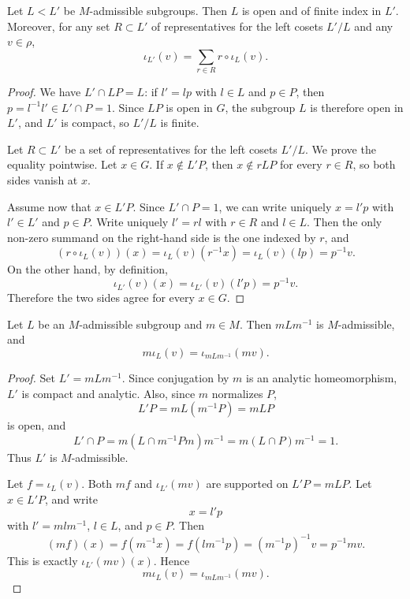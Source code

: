\documentclass[12pt,a4paper]{amsart}%
\begin{document}
\begin{lemma}\label{lem:iota.enlarge}
Let $L<L'$ be $M$-admissible subgroups. Then $L$ is open and of finite index in $L'$. Moreover, for any set $R\subset L'$ of representatives for the left cosets $L'/L$ and any $v\in \rho$,
$$
\iota_{L'}(v)=\sum_{r\in R} r\circ \iota_{L}(v).
$$
\end{lemma}
\begin{proof}
We have $L'\cap LP=L$: if $l'=lp$ with $l\in L$ and $p\in P$, then
$p=l^{-1}l'\in L'\cap P=1$. Since $LP$ is open in $G$, the subgroup $L$ is
therefore open in $L'$, and $L'$ is compact, so $L'/L$ is finite.

Let $R\subset L'$ be a set of representatives for the left cosets $L'/L$.
We prove the equality pointwise. Let $x\in G$. If $x\notin L'P$, then
$x\notin rLP$ for every $r\in R$, so both sides vanish at $x$.

Assume now that $x\in L'P$. Since $L'\cap P=1$, we can write uniquely
$x=l'p$ with $l'\in L'$ and $p\in P$. Write uniquely $l'=rl$ with
$r\in R$ and $l\in L$. Then the only non-zero summand on the right-hand side
is the one indexed by $r$, and
$$
(r\circ \iota_{L}(v))(x)
=
\iota_{L}(v)(r^{-1}x)
=
\iota_{L}(v)(lp)
=
p^{-1}v.
$$
On the other hand, by definition,
$$
\iota_{L'}(v)(x)=\iota_{L'}(v)(l'p)=p^{-1}v.
$$
Therefore the two sides agree for every $x\in G$.
\end{proof}





\begin{lemma}\label{lem:iota.M}
    Let $L$ be an $M$-admissible subgroup and $m\in M$.
    Then $mLm^{-1}$ is $M$-admissible, and
    $$m\iota_{L}(v)=\iota_{mLm^{-1}}(mv).$$
\end{lemma}
\begin{proof}
Set $L'=mLm^{-1}$. Since conjugation by $m$ is an analytic homeomorphism, $L'$ is compact and analytic. Also, since $m$ normalizes $P$,
$$
L'P=mL(m^{-1}P)=mLP
$$
is open, and
$$
L'\cap P
=
m(L\cap m^{-1}Pm)m^{-1}
=
m(L\cap P)m^{-1}
=
1.
$$
Thus $L'$ is $M$-admissible.

Let $f=\iota_{L}(v)$. Both $mf$ and $\iota_{L'}(mv)$ are supported on $L'P=mLP$. Let $x\in L'P$, and write
$$
x=l'p
$$
with $l'=mlm^{-1}$, $l\in L$, and $p\in P$. Then
$$
(mf)(x)
=
f(m^{-1}x)
=
f(lm^{-1}p)
=
(m^{-1}p)^{-1}v
=
p^{-1}mv.
$$
This is exactly $\iota_{L'}(mv)(x)$. Hence
$$
m\iota_{L}(v)=\iota_{mLm^{-1}}(mv).
$$
\end{proof}
\end{document}
